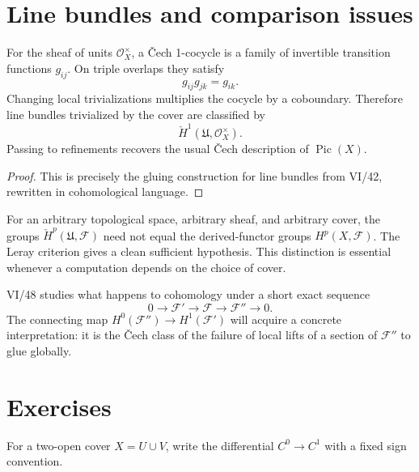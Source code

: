 \section{Line bundles and comparison issues}
\begin{proposition}\label{prop:vi47-pic-cech}
For the sheaf of units $\mathcal O_X^\times$, a \v{C}ech 1-cocycle is a family of invertible transition functions $g_{ij}$.  On triple overlaps they satisfy
\[
g_{ij}g_{jk}=g_{ik}.
\]
Changing local trivializations multiplies the cocycle by a coboundary.  Therefore line bundles trivialized by the cover are classified by
\[
\check H^1(\mathfrak U,\mathcal O_X^\times).
\]
Passing to refinements recovers the usual \v{C}ech description of $\operatorname{Pic}(X)$.
\begin{proof}
This is precisely the gluing construction for line bundles from VI/42, rewritten in cohomological language.
\end{proof}
\end{proposition}

\begin{warning}\label{warning:vi47-cech-sheaf}
For an arbitrary topological space, arbitrary sheaf, and arbitrary cover, the groups $\check H^p(\mathfrak U,\mathcal F)$ need not equal the derived-functor groups $H^p(X,\mathcal F)$.  The Leray criterion gives a clean sufficient hypothesis.  This distinction is essential whenever a computation depends on the choice of cover.
\end{warning}

\begin{remark}\label{remark:vi47-next}
VI/48 studies what happens to cohomology under a short exact sequence
\[
0\to\mathcal F'\to\mathcal F\to\mathcal F''\to0.
\]
The connecting map $H^0(\mathcal F'')\to H^1(\mathcal F')$ will acquire a concrete interpretation: it is the \v{C}ech class of the failure of local lifts of a section of $\mathcal F''$ to glue globally.
\end{remark}

\section{Exercises}
\begin{exercise}\label{exr:vi47-01}
For a two-open cover $X=U\cup V$, write the differential $C^0\to C^1$ with a fixed sign convention.
\end{exercise}

